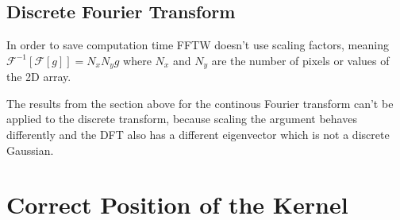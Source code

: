 \documentclass[10pt,a4paper]{article}
\begin{document}
\subsection{Discrete Fourier Transform}

In order to save computation time FFTW doesn't use scaling factors, meaning $\mathcal{F}^{-1}[\mathcal{F}[g]] = N_x N_y g$ where $N_x$ and $N_y$ are the number of pixels or values of the 2D array.

The results from the section above for the continous Fourier transform can't be applied to the discrete transform, because scaling the argument behaves differently and the DFT also has a different eigenvector which is not a discrete Gaussian.


\section{Correct Position of the Kernel}
\end{document}
